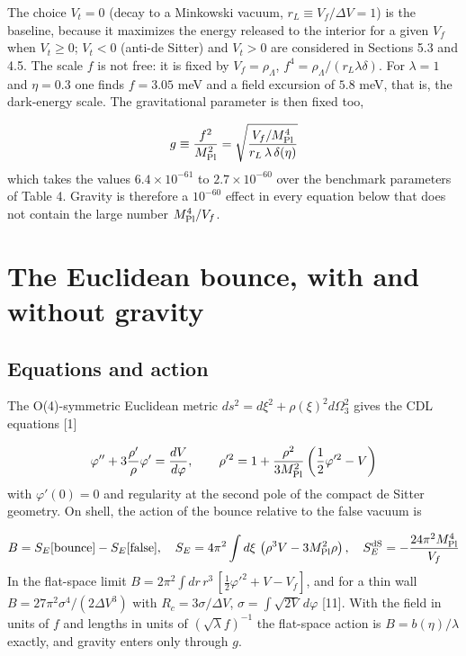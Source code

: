 \documentclass[11pt,a4paper]{article}
\begin{document}
The choice $V_t = 0$ (decay to a Minkowski vacuum, $r_L \equiv V_f/\Delta V = 1$) is the baseline, because it maximizes the energy released to the interior for a given $V_f$ when $V_t\ge0$; $V_t < 0$ (anti-de Sitter) and $V_t > 0$ are considered in Sections 5.3 and 4.5. The scale $f$ is not free: it is fixed by $V_f = \rho_\Lambda$, $f^4 = \rho_\Lambda/(r_L\lambda\delta)$. For $\lambda = 1$ and $\eta = 0.3$ one finds $f = 3.05$ meV and a field excursion of $5.8$ meV, that is, the dark-energy scale. The gravitational parameter is then fixed too,

\begin{equation}
g\equiv\frac{f^2}{M_{\rm Pl}^2}=\sqrt{\frac{V_f/M_{\rm Pl}^4}{r_L\,\lambda\,\delta(\eta)}}
\end{equation}
which takes the values $6.4\times10^{-61}$ to $2.7\times10^{-60}$ over the benchmark parameters of Table 4. Gravity is therefore a $10^{-60}$ effect in every equation below that does not contain the large number $M_{\rm Pl}^4/V_f$.

\section{The Euclidean bounce, with and without gravity}
\subsection{Equations and action}
The O(4)-symmetric Euclidean metric $ds^2 = d\xi^2 + \rho(\xi)^2 d\Omega_3^2$ gives the CDL equations [1]

\begin{equation}
\varphi''+3\frac{\rho'}{\rho}\varphi'=\frac{dV}{d\varphi},\qquad \rho'^2=1+\frac{\rho^2}{3M_{\rm Pl}^2}\left(\frac12\varphi'^2-V\right)
\end{equation}
with $\varphi'(0)=0$ and regularity at the second pole of the compact de Sitter geometry. On shell, the action of the bounce relative to the false vacuum is

\begin{equation}
B=S_E[{\rm bounce}]-S_E[{\rm false}],\quad S_E=4\pi^2\int d\xi\,\left(\rho^3V-3M_{\rm Pl}^2\rho\right),\quad S_E^{\rm dS}=-\frac{24\pi^2M_{\rm Pl}^4}{V_f}
\end{equation}
In the flat-space limit $B=2\pi^2\int dr\,r^3\,[\tfrac12\varphi'^2+V-V_f]$, and for a thin wall $B = 27\pi^2\sigma^4/(2\Delta V^3)$ with $R_c = 3\sigma/\Delta V$, $\sigma = \int\sqrt{2V}\,d\varphi$ [11]. With the field in units of $f$ and lengths in units of $(\sqrt\lambda f)^{-1}$ the flat-space action is $B = b(\eta)/\lambda$ exactly, and gravity enters only through $g$.
\end{document}
